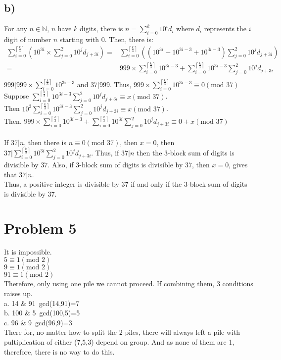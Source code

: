 \documentclass{article}
\begin{document}
\subsection*{b)}
For any \(n\in\mathbb{N}\), \(n\) have \(k\) digits, there is \(\displaystyle{n=\sum^k_{i=0}10^id_i}\) where \(d_i\) represents the \(i\) digit of number \(n\) starting with 0.
Then, there is: 
\begin{align*}
    \sum_{i=0}^{\left\lceil \frac{k}{3}\right\rceil} \left(10^{3i}\times \sum^2_{j=0} 10^jd_{j+3i}\right)
    =&\sum_{i=0}^{\left\lceil \frac{k}{3}\right\rceil} \left((10^{3i}-10^{3i-3}+10^{3i-3})\sum^2_{j=0} 10^jd_{j+3i}\right)\\
    =&999\times \sum_{i=0}^{\left\lceil \frac{k}{3}\right\rceil} 10^{3i-3}+\sum_{i=0}^{\left\lceil \frac{k}{3}\right\rceil}10^{3i-3}\sum^2_{j=0} 10^jd_{j+3i}\\
\end{align*}
\(999|999\times \sum_{i=0}^{\left\lceil \frac{k}{3}\right\rceil} 10^{3i-3}\) and \(37|999\). Thus, \(999\times \sum_{i=0}^{\left\lceil \frac{k}{3}\right\rceil} 10^{3i-3}\equiv 0 (\text{mod } 37)\)\\
Suppose \(\sum_{i=0}^{\left\lceil \frac{k}{3}\right\rceil}10^{3i-3}\sum^2_{j=0} 10^jd_{j+3i}\equiv x (\text{mod }37)\). \\
Then \(10^3 \sum_{i=0}^{\left\lceil \frac{k}{3}\right\rceil}10^{3i-3}\sum^2_{j=0} 10^jd_{j+3i}\equiv x (\text{mod }37)\). \\Then,
\(999\times \sum_{i=0}^{\left\lceil \frac{k}{3}\right\rceil} 10^{3i-3}+\sum_{i=0}^{\left\lceil \frac{k}{3}\right\rceil}10^{3i}\sum^2_{j=0} 10^jd_{j+3i} \equiv 0+x(\text{mod }37)\)\\ \\
If \(37|n\), then there is \(n\equiv 0(\text{mod }37)\), then \(x=0\), then \(37|\sum_{i=0}^{\left\lceil \frac{k}{3}\right\rceil}10^{3i}\sum^2_{j=0} 10^jd_{j+3i}\). Thus, if \(37|n\) then
the 3-block sum of digits is divisible by 37. Also, if  3-block sum of digits is divisible by 37, then \(x=0\), gives that \(37|n\).\\
Thus, a positive integer is divisible by 37 if and only if the 3-block sum of digits is divisible by 37.
\newpage
\section*{Problem 5}
It is impossible.\\
\(5\equiv1 (\text{mod }2)\)\\
\(9\equiv1 (\text{mod }2)\)\\
\(91\equiv1 (\text{mod }2)\)\\
Therefore, only using one pile we cannot proceed.
If combining them, 3 conditions raises up.\\
a. 14 \& 91\ gcd(14,91)=7\\
b. 100 \& 5\ gcd(100,5)=5\\
c. 96 \& 9\ gcd(96,9)=3\\
There for, no matter how to split the 2 piles, there will always left a pile with pultiplication of either (7,5,3) depend on group. And as none of them are 1, therefore, there is no way to do this.
\end{document}
